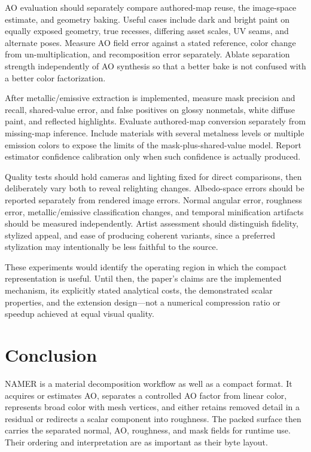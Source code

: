 \documentclass[11pt,letterpaper]{article}
\begin{document}
AO evaluation should separately compare authored-map reuse, the image-space estimate, and geometry baking. Useful cases include dark and bright paint on equally exposed geometry, true recesses, differing asset scales, UV seams, and alternate poses. Measure AO field error against a stated reference, color change from un-multiplication, and recomposition error separately. Ablate separation strength independently of AO synthesis so that a better bake is not confused with a better color factorization.

After metallic/emissive extraction is implemented, measure mask precision and recall, shared-value error, and false positives on glossy nonmetals, white diffuse paint, and reflected highlights. Evaluate authored-map conversion separately from missing-map inference. Include materials with several metalness levels or multiple emission colors to expose the limits of the mask-plus-shared-value model. Report estimator confidence calibration only when such confidence is actually produced.

Quality tests should hold cameras and lighting fixed for direct comparisons, then deliberately vary both to reveal relighting changes. Albedo-space errors should be reported separately from rendered image errors. Normal angular error, roughness error, metallic/emissive classification changes, and temporal minification artifacts should be measured independently. Artist assessment should distinguish fidelity, stylized appeal, and ease of producing coherent variants, since a preferred stylization may intentionally be less faithful to the source.

These experiments would identify the operating region in which the compact representation is useful. Until then, the paper's claims are the implemented mechanism, its explicitly stated analytical costs, the demonstrated scalar properties, and the extension design---not a numerical compression ratio or speedup achieved at equal visual quality.


\section{Conclusion}
NAMER is a material decomposition workflow as well as a compact format. It acquires or estimates AO, separates a controlled AO factor from linear color, represents broad color with mesh vertices, and either retains removed detail in a residual or redirects a scalar component into roughness. The packed surface then carries the separated normal, AO, roughness, and mask fields for runtime use. Their ordering and interpretation are as important as their byte layout.
\end{document}
